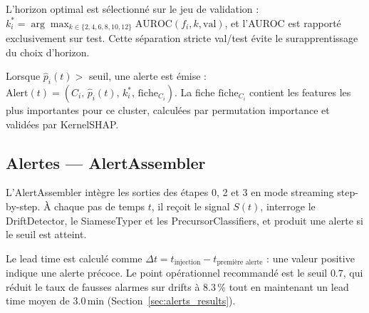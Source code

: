 L'horizon optimal est sélectionné sur le jeu de validation :
$k^*_i = \arg\max_{k \in \{2,4,6,8,10,12\}} \text{AUROC}(f_i, k, \text{val})$,
et l'AUROC est rapporté exclusivement sur test.
Cette séparation stricte val/test évite le surapprentissage du choix d'horizon.

Lorsque $\hat{p}_i(t) >$ seuil, une alerte est émise :
$\text{Alert}(t) = (C_i,\, \hat{p}_i(t),\, k^*_i,\, \text{fiche}_{C_i})$.
La fiche $\text{fiche}_{C_i}$ contient les features les plus importantes pour ce cluster,
calculées par permutation importance et validées par KernelSHAP.

\subsection{Alertes --- AlertAssembler}
\label{sec:alerts_impl}

L'AlertAssembler intègre les sorties des étapes 0, 2 et 3 en mode streaming step-by-step.
À chaque pas de temps $t$, il reçoit le signal $S(t)$, interroge le DriftDetector,
le SiameseTyper et les PrecursorClassifiers, et produit une alerte si le seuil est atteint.

Le lead time est calculé comme $\Delta t = t_\text{injection} - t_\text{première alerte}$ :
une valeur positive indique une alerte précoce. Le point opérationnel recommandé est
le seuil $0.7$, qui réduit le taux de fausses alarmes sur drifts à $8.3$\,\%
tout en maintenant un lead time moyen de $3.0$\,min (Section~\ref{sec:alerts_results}).
